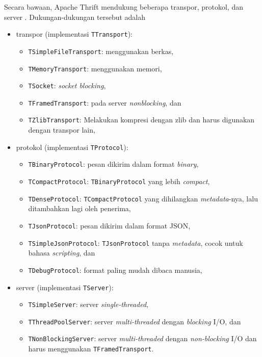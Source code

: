 Secara bawaan, Apache Thrift mendukung beberapa transpor, protokol, dan server
\parencite{prunicki_thrift}. Dukungan-dukungan tersebut adalah
\begin{itemize}
    \item transpor (implementasi \texttt{TTransport}):
          \begin{itemize}
              \item \texttt{TSim\-ple\-FileTrans\-port}: menggunakan berkas,
              \item \texttt{TMe\-mo\-ry\-Trans\-port}: menggunakan memori,
              \item \texttt{T\-Sock\-et}: \textit{socket blocking},
              \item \texttt{TFramed\-Trans\-port}: pada server
                    \textit{nonblocking}, dan
              \item \texttt{T\-Z\-lib\-Trans\-port}: Melakukan kompresi dengan
                    zlib dan harus digunakan dengan trans\-por lain,
          \end{itemize}
    \item protokol (implementasi \texttt{TProtocol}):
          \begin{itemize}
              \item \texttt{TBinaryProtocol}: pesan dikirim dalam format
                    \textit{binary},
              \item \texttt{TCompactProtocol}: \texttt{TBinaryProtocol} yang
                    lebih \textit{compact},
              \item \texttt{TDenseProtocol}: \texttt{TCompactProtocol} yang
                    di\-hi\-lang\-kan \textit{me\-ta\-da\-ta}-nya, lalu ditambahkan
                    lagi oleh penerima,
              \item \texttt{TJsonProtocol}: pesan dikirim dalam format JSON,
              \item \texttt{TSimpleJsonProtocol}: \texttt{TJsonProtocol} tanpa
                    \textit{metadata}, cocok untuk bahasa \textit{scripting}, dan
              \item \texttt{TDebugProtocol}: format paling mudah dibaca manusia,
          \end{itemize}
    \item server (implementasi \texttt{TServer}):
          \begin{itemize}
              \item \texttt{TSimpleServer}: server \textit{single-threaded},
              \item \texttt{TThreadPoolServer}: server \textit{multi-threaded}
                    dengan \textit{blocking} I/O, dan
              \item \texttt{TNonBlockingServer}: server \textit{multi-threaded}
                    dengan \textit{non-blocking} I/O dan harus menggunakan
                    \texttt{TFramedTransport}.
          \end{itemize}
\end{itemize}

